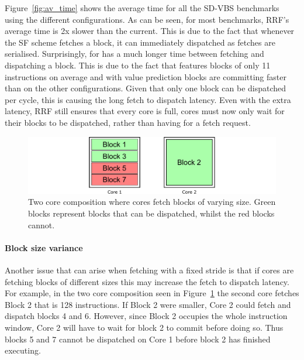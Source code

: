 Figure~\ref{fig:av_time} shows the average time for all the SD-VBS benchmarks using the different configurations.
As can be seen, for most benchmarks, RRF's average time is 2x slower than the current.
This is due to the fact that whenever the SF scheme fetches a block, it can immediately dispatched as fetches are serialised.
Surprisingly,  for \nfvp{} has a much longer time between fetching and dispatching a block.
This is due to the fact that  features blocks of only 11 instructions on average and with value prediction blocks are committing faster than on the other configurations.
Given that only one block can be dispatched per cycle, this is causing the long fetch to dispatch latency.
Even with the extra latency, RRF still ensures that every core is full, cores must now only wait for their blocks to be dispatched, rather than having for a fetch request.

\begin{figure}[t]
    \centering
    \includegraphics[width=1\textwidth]{chapter3/graphics/fetch_ex.pdf}
    \caption{Two core composition where cores fetch blocks of varying size. Green blocks represent blocks that can be dispatched, whilst the red blocks cannot.}
    \label{fig:var_ex}
	\vspace{1em}
\end{figure}

\paragraph*{Block size variance}
Another issue that can arise when fetching with a fixed stride is that if cores are fetching blocks of different sizes this may increase the fetch to dispatch latency.
For example, in the two core composition seen in Figure~\ref{fig:var_ex} the second core fetches Block 2 that is 128 instructions.
If Block 2 were smaller, Core 2 could fetch and dispatch blocks 4 and 6.
However, since Block 2 occupies the whole instruction window, Core 2 will have to wait for block 2 to commit before doing so.
Thus blocks 5 and 7 cannot be dispatched on Core 1 before block 2 has finished executing.

